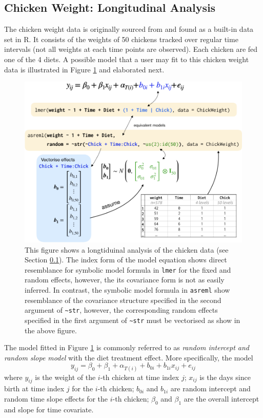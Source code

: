 \documentclass[runningheads]{llncs}
\begin{document}
\hypertarget{chick}{%
\subsection{Chicken Weight: Longitudinal Analysis}\label{chick}}

The chicken weight data is originally sourced from \textcite{chickendata} and found as a built-in data set in R. It consists of the weights of 50 chickens tracked over regular time intervals (not all weights at each time points are observed). Each chicken are fed one of the 4 diets. A possible model that a user may fit to this chicken weight data is illustrated in Figure \ref{fig:symbolic-lmm} and elaborated next.

\begin{figure}
\includegraphics[width=0.9\linewidth,fbox]{images/symbolic_lmm} \caption{This figure shows a longtiduinal analysis of the chicken data (see Section \ref{chick}). The index form of the model equation shows direct resemblance for symbolic model formula in \texttt{lmer} for the fixed and random effects, however, the its covariance form is not as easily inferred. In contrast, the symbolic model formula in \texttt{asreml} show resemblance of the covariance structure specified in the second argument of \texttt{\textasciitilde{}str}, however, the corresponding random effects specified in the first argument of \texttt{\textasciitilde{}str} must be vectorised as show in the above figure.}\label{fig:symbolic-lmm}
\end{figure}



The model fitted in Figure \ref{fig:symbolic-lmm} is commonly referred to as \emph{random intercept and random slope model} with the diet treatment effect. More specifically, the model
\[y_{ij} = \beta_0 + \beta_1 + \alpha_{T(i)} + b_{0i} + b_{1i}x_{ij} + e_{ij}\]
where \(y_{ij}\) is the weight of the \(i\)-th chicken at time index \(j\); \(x_{ij}\) is the days since birth at time index \(j\) for the \(i\)-th chicken; \(b_{0i}\) and \(b_{1i}\) are random intercept and random time slope effects for the \(i\)-th chicken; \(\beta_0\) and \(\beta_1\) are the overall intercept and slope for time covariate.
\end{document}
